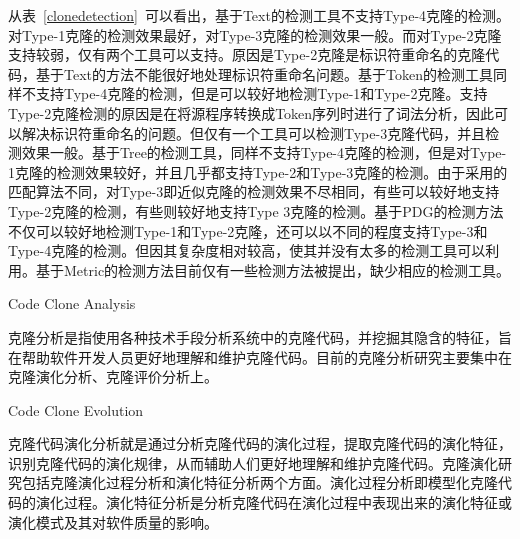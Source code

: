 从表~\ref{clonedetection}~可以看出，基于Text的检测工具不支持Type-4克隆的检测。对Type-1克隆的检测效果最好，对Type-3克隆的检测效果一般。而对Type-2克隆支持较弱，仅有两个工具可以支持。原因是Type-2克隆是标识符重命名的克隆代码，基于Text的方法不能很好地处理标识符重命名问题。基于Token的检测工具同样不支持Type-4克隆的检测，但是可以较好地检测Type-1和Type-2克隆。支持Type-2克隆检测的原因是在将源程序转换成Token序列时进行了词法分析，因此可以解决标识符重命名的问题。但仅有一个工具可以检测Type-3克隆代码，并且检测效果一般。基于Tree的检测工具，同样不支持Type-4克隆的检测，但是对Type-1克隆的检测效果较好，并且几乎都支持Type-2和Type-3克隆的检测。由于采用的匹配算法不同，对Type-3即近似克隆的检测效果不尽相同，有些可以较好地支持Type-2克隆的检测，有些则较好地支持Type 3克隆的检测。基于PDG的检测方法不仅可以较好地检测Type-1和Type-2克隆，还可以以不同的程度支持Type-3和Type-4克隆的检测。但因其复杂度相对较高，使其并没有太多的检测工具可以利用。基于Metric的检测方法目前仅有一些检测方法被提出\cite{kontogiannis1996pattern}\cite{mayrand1996experiment}，缺少相应的检测工具。


{Code Clone Analysis}

克隆分析是指使用各种技术手段分析系统中的克隆代码，并挖掘其隐含的特征，旨在帮助软件开发人员更好地理解和维护克隆代码。目前的克隆分析研究主要集中在克隆演化分析、克隆评价分析上。

{Code Clone Evolution}

克隆代码演化分析就是通过分析克隆代码的演化过程，提取克隆代码的演化特征，识别克隆代码的演化规律，从而辅助人们更好地理解和维护克隆代码。克隆演化研究包括克隆演化过程分析和演化特征分析两个方面。演化过程分析即模型化克隆代码的演化过程。演化特征分析是分析克隆代码在演化过程中表现出来的演化特征或演化模式及其对软件质量的影响。

